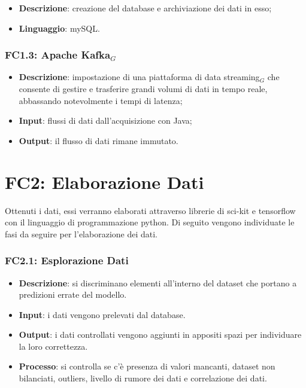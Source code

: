 \begin{itemize}
	\item \textbf{Descrizione}: creazione del database e archiviazione dei dati in esso;
	\item \textbf{Linguaggio}: mySQL.
\end{itemize}

\subsubsection{FC1.3: Apache Kafka$_G$}

\begin{itemize}
	\item \textbf{Descrizione}: impostazione di una piattaforma di data streaming$_G$ che consente di gestire e trasferire grandi volumi di dati in tempo reale, abbassando notevolmente i tempi di latenza;
	\item \textbf{Input}: flussi di dati dall'acquisizione con Java;
		\item \textbf{Output}: il flusso di dati rimane immutato.
\end{itemize}


\section{FC2: Elaborazione Dati}
Ottenuti i dati, essi verranno elaborati attraverso librerie di sci-kit e tensorflow con il linguaggio di programmazione python.
Di seguito vengono individuate le fasi da seguire per l'elaborazione dei dati.

\subsubsection{FC2.1: Esplorazione Dati}

\begin{itemize}
	\item \textbf{Descrizione}: si discriminano elementi all'interno del dataset che portano a predizioni errate del modello.
	\item \textbf{Input}: i dati vengono prelevati dal database.
	\item \textbf{Output}: i dati controllati vengono aggiunti in appositi spazi per individuare la loro correttezza.
	\item \textbf{Processo}: si controlla se c'è presenza di valori mancanti, dataset non bilanciati, outliers, livello di rumore dei dati e correlazione dei dati. %
\end{itemize}

